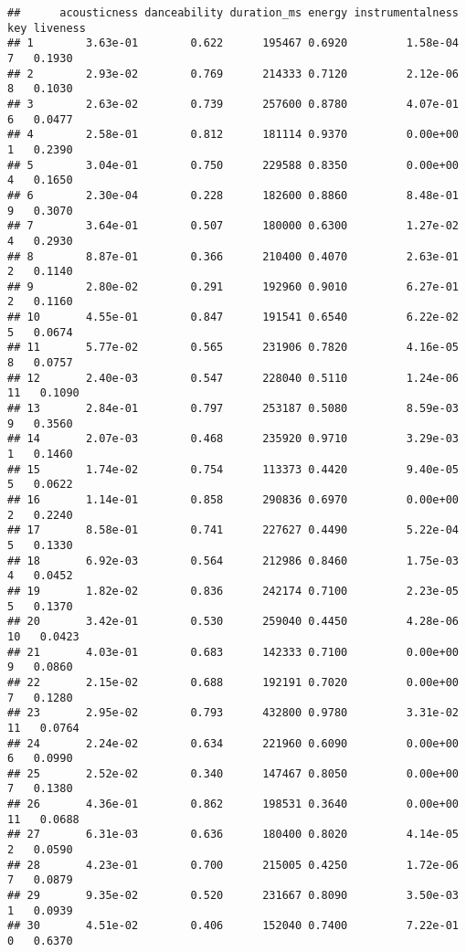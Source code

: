 \documentclass[
]{article}
\begin{document}
\begin{verbatim}
##      acousticness danceability duration_ms energy instrumentalness key liveness
## 1        3.63e-01        0.622      195467 0.6920         1.58e-04   7   0.1930
## 2        2.93e-02        0.769      214333 0.7120         2.12e-06   8   0.1030
## 3        2.63e-02        0.739      257600 0.8780         4.07e-01   6   0.0477
## 4        2.58e-01        0.812      181114 0.9370         0.00e+00   1   0.2390
## 5        3.04e-01        0.750      229588 0.8350         0.00e+00   4   0.1650
## 6        2.30e-04        0.228      182600 0.8860         8.48e-01   9   0.3070
## 7        3.64e-01        0.507      180000 0.6300         1.27e-02   4   0.2930
## 8        8.87e-01        0.366      210400 0.4070         2.63e-01   2   0.1140
## 9        2.80e-02        0.291      192960 0.9010         6.27e-01   2   0.1160
## 10       4.55e-01        0.847      191541 0.6540         6.22e-02   5   0.0674
## 11       5.77e-02        0.565      231906 0.7820         4.16e-05   8   0.0757
## 12       2.40e-03        0.547      228040 0.5110         1.24e-06  11   0.1090
## 13       2.84e-01        0.797      253187 0.5080         8.59e-03   9   0.3560
## 14       2.07e-03        0.468      235920 0.9710         3.29e-03   1   0.1460
## 15       1.74e-02        0.754      113373 0.4420         9.40e-05   5   0.0622
## 16       1.14e-01        0.858      290836 0.6970         0.00e+00   2   0.2240
## 17       8.58e-01        0.741      227627 0.4490         5.22e-04   5   0.1330
## 18       6.92e-03        0.564      212986 0.8460         1.75e-03   4   0.0452
## 19       1.82e-02        0.836      242174 0.7100         2.23e-05   5   0.1370
## 20       3.42e-01        0.530      259040 0.4450         4.28e-06  10   0.0423
## 21       4.03e-01        0.683      142333 0.7100         0.00e+00   9   0.0860
## 22       2.15e-02        0.688      192191 0.7020         0.00e+00   7   0.1280
## 23       2.95e-02        0.793      432800 0.9780         3.31e-02  11   0.0764
## 24       2.24e-02        0.634      221960 0.6090         0.00e+00   6   0.0990
## 25       2.52e-02        0.340      147467 0.8050         0.00e+00   7   0.1380
## 26       4.36e-01        0.862      198531 0.3640         0.00e+00  11   0.0688
## 27       6.31e-03        0.636      180400 0.8020         4.14e-05   2   0.0590
## 28       4.23e-01        0.700      215005 0.4250         1.72e-06   7   0.0879
## 29       9.35e-02        0.520      231667 0.8090         3.50e-03   1   0.0939
## 30       4.51e-02        0.406      152040 0.7400         7.22e-01   0   0.6370

\end{verbatim}
\end{document}
